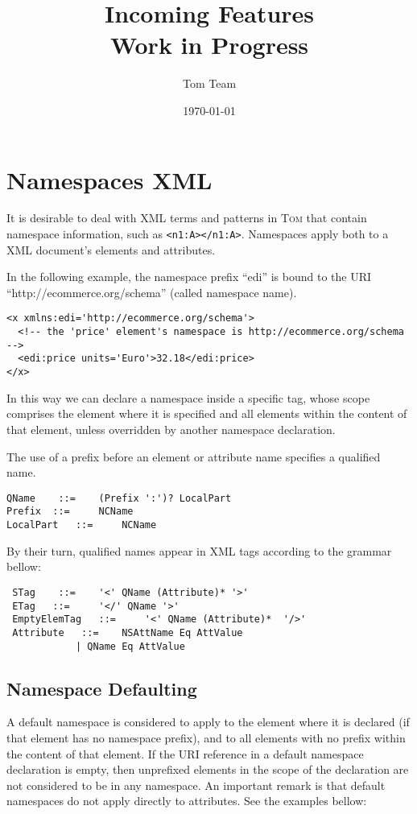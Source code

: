 \documentclass{article}
\title{Incoming Features\\Work in Progress}
\author{Tom Team}
\date\today
\newcommand{\tom}{\textsc{Tom} }
\begin{document}
\maketitle

\tableofcontents

\section{Namespaces XML}
It is desirable to deal with XML terms and patterns in \tom that contain namespace information, such as 
\verb$<n1:A></n1:A>$. Namespaces apply both to a XML document's elements and attributes. 

In the following example, the namespace prefix ``edi'' is bound to the URI ``http://ecommerce.org/schema'' (called namespace name). 

\begin{verbatim}
<x xmlns:edi='http://ecommerce.org/schema'>
  <!-- the 'price' element's namespace is http://ecommerce.org/schema -->
  <edi:price units='Euro'>32.18</edi:price>
</x>
\end{verbatim}

In this way we can declare a namespace inside a specific tag, whose scope comprises the element where it is specified and all elements within the content of that element, unless overridden by another namespace declaration. 

The use of a prefix before an element or attribute name specifies a qualified name.

\begin{verbatim}
QName 	 ::= 	(Prefix ':')? LocalPart
Prefix 	::= 	NCName
LocalPart 	::= 	NCName
\end{verbatim}


By their turn, qualified names appear in XML tags according to the grammar bellow:

\begin{verbatim}
 STag 	 ::= 	'<' QName (Attribute)* '>' 	 
 ETag 	::= 	'</' QName '>' 	
 EmptyElemTag 	::= 	'<' QName (Attribute)*  '/>' 	
 Attribute 	 ::= 	NSAttName Eq AttValue
			| QName Eq AttValue
\end{verbatim}

\subsection{Namespace Defaulting}

A default namespace is considered to apply to the element where it is declared (if that element has no namespace prefix), and to all elements with no prefix within the content of that element. If the URI reference in a default namespace declaration is empty, then unprefixed elements in the scope of the declaration are not considered to be in any namespace. An important remark is that default namespaces do not apply directly to attributes. See the examples bellow:
\end{document}
